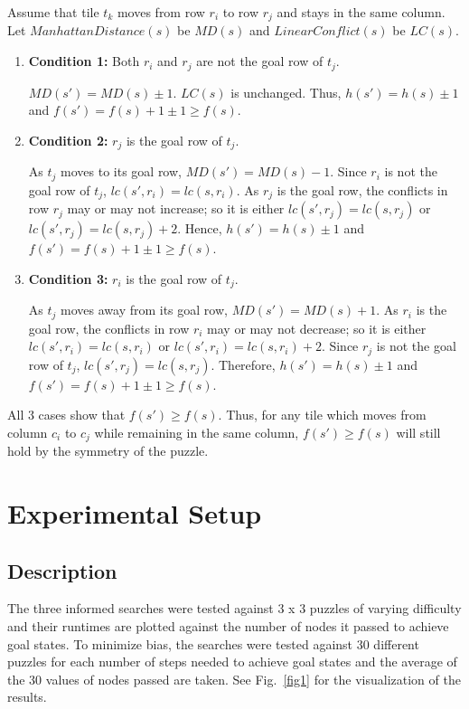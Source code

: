 \documentclass[runningheads]{llncs}
\begin{document}
Assume that tile \( t_k \) moves from row \( r_i \) to row \( r_j \) and stays in the same column. Let \( ManhattanDistance(s) \) be \( MD(s) \) and \( LinearConflict(s) \) be \( LC(s) \). 
\begin{enumerate}
    \item \textbf{Condition 1:} Both \( r_i \) and \( r_j \) are not the goal row of \( t_j \).
    
        \( MD(s') = MD(s) \pm 1 \). \( LC(s) \) is unchanged. Thus, \( h(s') = h(s) \pm 1 \) and \( f(s') = f(s) + 1 \pm 1 \geq f(s) \).
    
    \item \textbf{Condition 2:} \( r_j \) is the goal row of \( t_j \).
        
        As \( t_j \) moves to its goal row, \( MD(s') = MD(s) - 1 \). Since \( r_i \) is not the goal row of \( t_j \), \( lc(s', r_i) = lc(s, r_i) \). 
        As \( r_j \) is the goal row, the conflicts in row \( r_j \) may or may not increase; so it is either \( lc(s', r_j) = lc(s, r_j) \) or \( lc(s', r_j) = lc(s, r_j) + 2 \). 
        Hence, \( h(s') = h(s) \pm 1 \) and \( f(s') = f(s) + 1 \pm 1 \geq f(s) \).

    \item \textbf{Condition 3:} \( r_i \) is the goal row of \( t_j \).
    
        As \( t_j \) moves away from its goal row, \( MD(s') = MD(s) + 1 \). 
        As \( r_i \) is the goal row, the conflicts in row \( r_i \) may or may not decrease; so it is either \( lc(s', r_i) = lc(s, r_i) \) or \( lc(s', r_i) = lc(s, r_i) + 2 \). 
        Since \( r_j \) is not the goal row of \( t_j \), \( lc(s', r_j) = lc(s, r_j) \). 
        Therefore, \( h(s') = h(s) \pm 1 \) and \( f(s') = f(s) + 1 \pm 1 \geq f(s) \).
\end{enumerate}
All 3 cases show that \( f(s') \geq f(s) \). Thus, for any tile which moves from column \( c_i \) to \( c_j \) while remaining in the same column, \( f(s') \geq f(s) \) will still hold by the symmetry of the puzzle.


\section{Experimental Setup}
\subsection{Description}
The three informed searches were tested against 3 x 3 puzzles of varying difficulty and their runtimes are plotted against the number of nodes it passed to achieve goal states. To minimize bias, the searches were tested against 30 different puzzles for each number of steps needed to achieve goal states and the average of the 30 values of nodes passed are taken. See
Fig.~\ref{fig1} for the visualization of the results.
\end{document}
